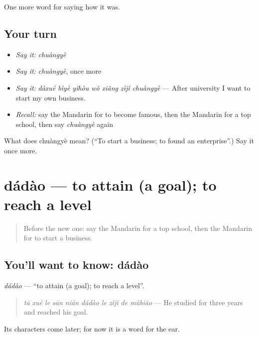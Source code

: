 \begin{grammarlens}[title={What you've built}]
One more word for saying how it was.
\end{grammarlens}

\subsection*{Your turn}
\begin{itemize}
\raggedright
  \item \emph{Say it:} \emph{chuàngyè}
  \item \emph{Say it:} \emph{chuàngyè}, once more
  \item \emph{Say it:} \emph{dàxué bìyè yǐhòu wǒ xiǎng zìjǐ chuàngyè} — After university I want to start my own business.
  \item \emph{Recall:} say the Mandarin for to become famous, then the Mandarin for a top school, then say \emph{chuàngyè} again
\end{itemize}

\begin{tcolorbox}[breakable,colback=teal!4,colframe=teal!35!black,title={Before you move on}]
What does chuàngyè mean? (\textquotedblleft{}To start a business; to found an enterprise\textquotedblright{}.) Say it once more.
\end{tcolorbox}
\section[dádào]{dádào — to attain (a goal); to reach a level}

\label{lesson:ZH-C513-dadao}



\begin{quote}
Before the new one: say the Mandarin for a top school, then the Mandarin for to start a business.
\end{quote}

\subsection*{You'll want to know: dádào}
\emph{dádào} — \textquotedblleft{}to attain (a goal); to reach a level\textquotedblright{}.

\begin{quote}
\emph{tā xué le sān nián dádào le zìjǐ de mùbiāo} — He studied for three years and reached his goal.
\end{quote}

Its characters come later; for now it is a word for the ear.

